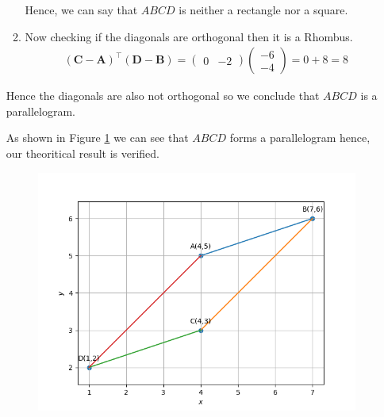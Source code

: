\documentclass[12pt]{article}
\newcommand{\myvec}[1]{\ensuremath{\begin{pmatrix}#1\end{pmatrix}}}
\let\vec\mathbf
\begin{document}
\begin{enumerate}
\begin{enumerate}
	Hence, we can say that $ABCD$ is neither a rectangle nor a square.

		\item Now checking if the diagonals are orthogonal then it is a Rhombus.
	\begin{align}
		(\vec{C}- \vec{A})^\top (\vec{D}-\vec{B}) = \myvec{0&-2} \myvec{-6\\-4} = 0+8 = 8
	\end{align}
	\end{enumerate}		
	Hence the diagonals are also not orthogonal so we conclude that $ABCD$ is a parallelogram.

	As shown in Figure \ref{fig:Fig3} we can see that $ABCD$ forms a parallelogram hence, our theoritical result is verified.

\begin{figure}[!h]
	\begin{center} 
	    \includegraphics[width=\columnwidth]{figs/quad3}
	\end{center}
\caption{}
\label{fig:Fig3}
\end{figure}
\end{enumerate}
\end{document}
